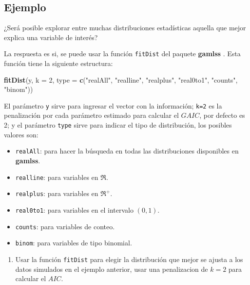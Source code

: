 \documentclass[10pt,]{krantz}
\makeatletter
\newenvironment{Shaded}{\begin{snugshade}}{\end{snugshade}}
\newcommand{\KeywordTok}[1]{\textcolor[rgb]{0.13,0.29,0.53}{\textbf{#1}}}
\newcommand{\DataTypeTok}[1]{\textcolor[rgb]{0.13,0.29,0.53}{#1}}
\newcommand{\DecValTok}[1]{\textcolor[rgb]{0.00,0.00,0.81}{#1}}
\newcommand{\StringTok}[1]{\textcolor[rgb]{0.31,0.60,0.02}{#1}}
\newcommand{\NormalTok}[1]{#1}
\providecommand{\tightlist}{%
  \setlength{\itemsep}{0pt}\setlength{\parskip}{0pt}}
\newenvironment{kframe}{%
\medskip{}
\setlength{\fboxsep}{.8em}
 \def\at@end@of@kframe{}%
 \ifinner\ifhmode%
  \def\at@end@of@kframe{\end{minipage}}%
  \begin{minipage}{\columnwidth}%
 \fi\fi%
 \def\FrameCommand##1{\hskip\@totalleftmargin \hskip-\fboxsep
 \colorbox{shadecolor}{##1}\hskip-\fboxsep
     \hskip-\linewidth \hskip-\@totalleftmargin \hskip\columnwidth}%
 \MakeFramed {\advance\hsize-\width
   \@totalleftmargin\z@ \linewidth\hsize
   \@setminipage}}%
 {\par\unskip\endMakeFramed%
 \at@end@of@kframe}
\renewenvironment{Shaded}{\begin{kframe}}{\end{kframe}}
\makeatother
\begin{document}
\subsection*{Ejemplo}\label{ejemplo-52}


¿Será posible explorar entre muchas distribuciones estadísticas aquella
que mejor explica una variable de interés?

La respuesta es si, se puede usar la función \texttt{fitDist} del
paquete \textbf{gamlss} . Esta función tiene la siguiente
estructura:

\begin{Shaded}
\begin{Highlighting}[]
\KeywordTok{fitDist}\NormalTok{(y, }\DataTypeTok{k =} \DecValTok{2}\NormalTok{, }
      \DataTypeTok{type =} \KeywordTok{c}\NormalTok{(}\StringTok{"realAll"}\NormalTok{, }\StringTok{"realline"}\NormalTok{, }\StringTok{"realplus"}\NormalTok{,}
               \StringTok{"real0to1"}\NormalTok{, }\StringTok{"counts"}\NormalTok{, }\StringTok{"binom"}\NormalTok{))}
\end{Highlighting}
\end{Shaded}

El parámetro \texttt{y} sirve para ingresar el vector con la
información; \texttt{k=2} es la penalización por cada parámetro estimado
para calcular el \(GAIC\), por defecto es 2; y el parámetro
\texttt{type} sirve para indicar el tipo de distribución, los posibles
valores son:

\begin{itemize}
\tightlist
\item
  \texttt{realAll}: para hacer la búsqueda en todas las distribuciones
  disponibles en \textbf{gamlss}.
\item
  \texttt{realline}: para variables en \(\Re\).
\item
  \texttt{realplus}: para variables en \(\Re^+\).
\item
  \texttt{real0to1}: para variables en el intervalo \((0, 1)\).
\item
  \texttt{counts}: para variables de conteo.
\item
  \texttt{binom}: para variables de tipo binomial.
\end{itemize}

\begin{enumerate}
\def\labelenumi{\arabic{enumi})}
\tightlist
\item
  Usar la función \texttt{fitDist} para elegir la distribución que mejor
  se ajusta a los datos simulados en el ejemplo anterior, usar una
  penalizacion de \(k=2\) para calcular el \(AIC\).
\end{enumerate}
\end{document}
